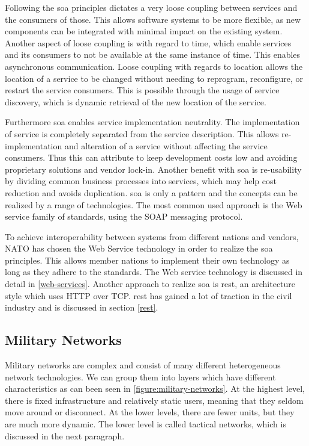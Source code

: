 Following the \gls{soa} principles dictates a very loose coupling between
services and the consumers of those. This allows software systems to be more
flexible, as new components can be integrated with minimal impact on the
existing system. Another aspect of loose coupling is with regard to time, which
enable services and its consumers to not be available at the same instance of
time. This enables asynchronous communication. Loose coupling with regards to
location allows the location of a service to be changed without needing to
reprogram, reconfigure, or restart the service consumers. This is possible
through the usage of service discovery, which is dynamic retrieval of the new
location of the service.

Furthermore \gls{soa} enables service implementation neutrality. The
implementation of service is completely separated from the service
description. This allows re-implementation and alteration of a service without
affecting the service consumers. Thus this can attribute to keep development
costs low and avoiding proprietary solutions and vendor lock-in. Another
benefit with \gls{soa} is re-usability by dividing common business processes
into services, which may help cost reduction and avoids duplication. \gls{soa}
is only a pattern and the concepts can be realized by a range of technologies.
The most common used approach is the Web service family of standards, using
the SOAP messaging protocol.

To achieve interoperability between systems from different nations and vendors,
NATO has chosen the Web Service technology in order to realize the \gls{soa}
principles\cite{soa-baseline}. This allows member nations to implement their own
technology as long as they adhere to the standards. The Web service technology
is discussed in detail in \cref{web-services}. Another approach to realize
\gls{soa} is \gls{rest}, an architecture style which uses HTTP over TCP.
\gls{rest} has gained a lot of traction in the civil industry and is discussed
in section \cref{rest}.


\subsection{Military Networks}

Military networks are complex and consist of many different heterogeneous
network technologies. We can group them into layers which have different
characteristics as can been seen in \cref{figure:military-networks}. At the
highest level, there is fixed infrastructure and relatively static users,
meaning that they seldom move around or disconnect. At the lower levels, there
are fewer units, but they are much more dynamic. The lower level is called
tactical networks, which is discussed in the next paragraph.

